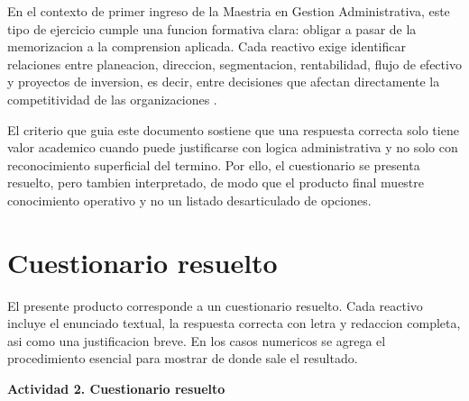 \documentclass[
	spanish,
	letterpaper, oneside
]{article}
\begin{document}
En el contexto de primer ingreso de la Maestria en Gestion Administrativa, este tipo de ejercicio cumple una funcion formativa clara: obligar a pasar de la memorizacion a la comprension aplicada. Cada reactivo exige identificar relaciones entre planeacion, direccion, segmentacion, rentabilidad, flujo de efectivo y proyectos de inversion, es decir, entre decisiones que afectan directamente la competitividad de las organizaciones \citep{amelicaProcesoAdmin2019,unadmFundAdmin}.

El criterio que guia este documento sostiene que una respuesta correcta solo tiene valor academico cuando puede justificarse con logica administrativa y no solo con reconocimiento superficial del termino. Por ello, el cuestionario se presenta resuelto, pero tambien interpretado, de modo que el producto final muestre conocimiento operativo y no un listado desarticulado de opciones.

\section{Cuestionario resuelto}

El presente producto corresponde a un cuestionario resuelto. Cada reactivo incluye el enunciado textual, la respuesta correcta con letra y redaccion completa, asi como una justificacion breve. En los casos numericos se agrega el procedimiento esencial para mostrar de donde sale el resultado.

\begin{center}
\textbf{\large Actividad 2. Cuestionario resuelto}
\end{center}
\end{document}
